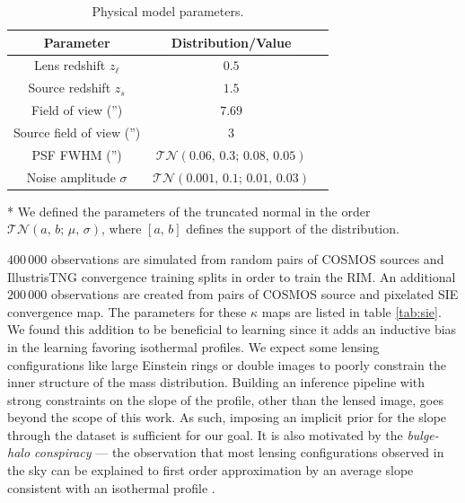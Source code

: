 \begin{table}[htb!]
\centering
\begin{threeparttable}
\caption{Physical model parameters.}
\label{tab:phys}
\begin{tabular}{ccc}
        Parameter &  Distribution/Value \\
        \hline \hline
        Lens redshift $z_\ell$ & $0.5$ \\
        Source redshift $z_s$ & $1.5$ \\
        Field of view ('') & $7.69$ \\
        Source field of view ('') & $3$ \\
        PSF FWHM ('') & $\mathcal{TN}(0.06,\, 0.3;\, 0.08,\, 0.05)$\tnote{*}\\
        Noise amplitude $\sigma$ & $\mathcal{TN}(0.001,\, 0.1;\, 0.01,\,0.03)$\tnote{*}\\
        \hline
\end{tabular}
\begin{tablenotes}\footnotesize
\item[*]We defined the parameters of the truncated normal in the order $\mathcal{TN}(a,\, b;\, \mu,\, \sigma)$, where $[a,\, b]$ defines the support of the distribution.
\end{tablenotes}
\end{threeparttable}
\end{table}

$400\,000$ observations are simulated from random pairs of COSMOS sources 
and IllustrisTNG convergence training splits in order to train the RIM. 
An additional $200\,000$ observations are created from pairs 
of COSMOS source and pixelated SIE convergence map. 
The parameters for these $\kappa$ maps are listed in table \ref{tab:sie}. 
We found this addition to be beneficial to learning since it adds an 
inductive bias in the learning favoring isothermal profiles.
We expect some lensing configurations like 
large Einstein rings or double images to poorly constrain the inner structure of the 
mass distribution. 
Building an inference pipeline with strong constraints on the 
slope of the profile, other than the lensed image, goes beyond the scope of this work. 
As such, imposing an implicit prior for the slope through 
the dataset is sufficient for our goal. 
It is also motivated by the \textit{bulge-halo conspiracy} --- 
the observation that most lensing configurations observed in the sky can be explained 
to first order approximation by 
an average slope consistent with an isothermal profile \citep{Auger2010,Dutton2014}.


